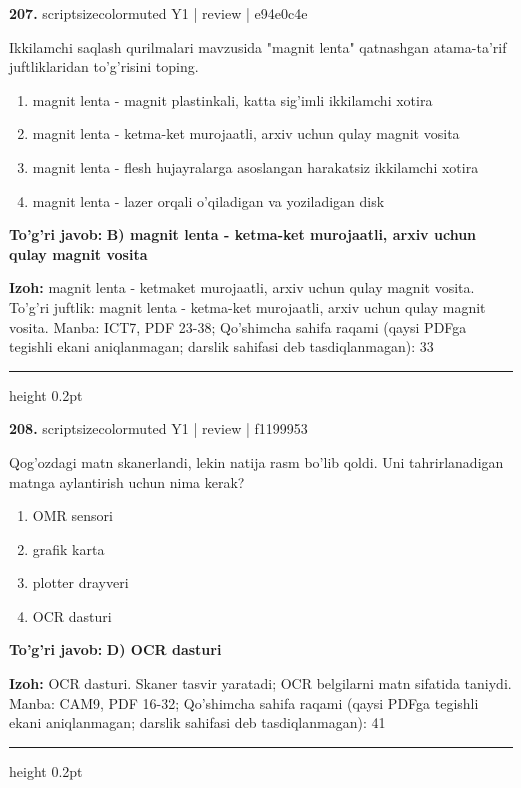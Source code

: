 \documentclass[10pt,a4paper]{article}
\begin{document}
{\bfseries\sffamily\color{ink} 207.} {scriptsizecolor{muted} Y1 | review | e94e0c4e}
\par
Ikkilamchi saqlash qurilmalari mavzusida "magnit lenta" qatnashgan atama-ta'rif juftliklaridan to'g'risini toping.
\begin{enumerate}[label=\Alph*),leftmargin=9mm]
\item magnit lenta - magnit plastinkali, katta sig'imli ikkilamchi xotira
\item magnit lenta - ketma-ket murojaatli, arxiv uchun qulay magnit vosita
\item magnit lenta - flesh hujayralarga asoslangan harakatsiz ikkilamchi xotira
\item magnit lenta - lazer orqali o'qiladigan va yoziladigan disk
\end{enumerate}
\begin{tcolorbox}[enhanced,breakable,colback=teal!4,colframe=teal!60!black,boxrule=0.45pt,arc=1.2mm,left=2.7mm,right=2.7mm,top=1.8mm,bottom=1.8mm,before skip=2mm,after skip=2mm]
{\bfseries\sffamily\color{teal}To'g'ri javob:} \textbf{B) magnit lenta - ketma-ket murojaatli, arxiv uchun qulay magnit vosita}
\par\smallskip
{\bfseries Izoh:} magnit lenta - ketmaket murojaatli, arxiv uchun qulay magnit vosita. To'g'ri juftlik: magnit lenta - ketma-ket murojaatli, arxiv uchun qulay magnit vosita. Manba: ICT7, PDF 23-38; Qo'shimcha sahifa raqami (qaysi PDFga tegishli ekani aniqlanmagan; darslik sahifasi deb tasdiqlanmagan): 33
\end{tcolorbox}
\vspace{2mm}\hrule height 0.2pt\vspace{3mm}

{\bfseries\sffamily\color{ink} 208.} {scriptsizecolor{muted} Y1 | review | f1199953}
\par
Qog'ozdagi matn skanerlandi, lekin natija rasm bo'lib qoldi. Uni tahrirlanadigan matnga aylantirish uchun nima kerak?
\begin{enumerate}[label=\Alph*),leftmargin=9mm]
\item OMR sensori
\item grafik karta
\item plotter drayveri
\item OCR dasturi
\end{enumerate}
\begin{tcolorbox}[enhanced,breakable,colback=teal!4,colframe=teal!60!black,boxrule=0.45pt,arc=1.2mm,left=2.7mm,right=2.7mm,top=1.8mm,bottom=1.8mm,before skip=2mm,after skip=2mm]
{\bfseries\sffamily\color{teal}To'g'ri javob:} \textbf{D) OCR dasturi}
\par\smallskip
{\bfseries Izoh:} OCR dasturi. Skaner tasvir yaratadi; OCR belgilarni matn sifatida taniydi. Manba: CAM9, PDF 16-32; Qo'shimcha sahifa raqami (qaysi PDFga tegishli ekani aniqlanmagan; darslik sahifasi deb tasdiqlanmagan): 41
\end{tcolorbox}
\vspace{2mm}\hrule height 0.2pt\vspace{3mm}
\end{document}
